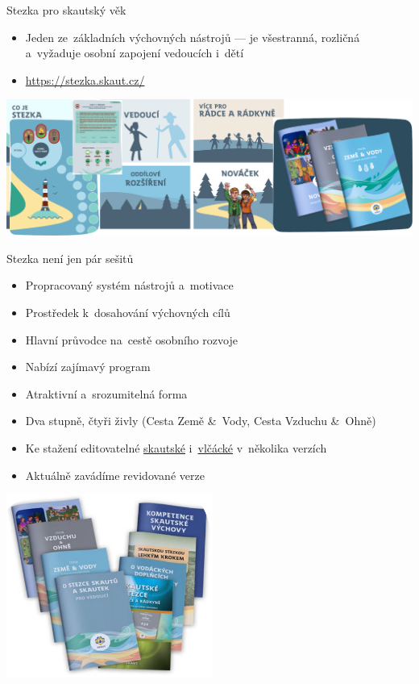 \documentclass[compress, ucs, xelatex, 11pt, xcolor=dvipsnames, print, aspectratio=169,
	hyperref={
		bookmarks=true,
		unicode=true,
		colorlinks=true,
		pdftitle={Skautska vychovna metoda},
		plainpages=false,
		pdfauthor={Vojtech Zeisek},
		pdfsubject={Skautska vychovna metoda a jeji vyvoj za posledni stoleti a desetileti},
		pdfcreator={XeLaTeX},
		pdfkeywords={Junak, Pedagogika, Skaut, Skauting, Vychovna metoda},
		linkcolor=Red, %
		anchorcolor=ForestGreen, %
		citecolor=ForestGreen, %
		filecolor=ForestGreen, %
		menucolor=ForestGreen, %
		urlcolor=Sepia, %
		pdftex},
	url={hyphens, lowtilde} %
	]{beamer}
\begin{document}
\begin{frame}{Stezka pro skautský věk}
	\begin{itemize}
		\item Jeden ze~základních výchovných nástrojů --- je všestranná, rozličná a~vyžaduje osobní zapojení vedoucích i~dětí
		\item \url{https://stezka.skaut.cz/}
	\end{itemize}
	\begin{center}
		\includegraphics[width=\textwidth]{stezka.png}
	\end{center}
\end{frame}

\begin{frame}{Stezka není jen pár sešitů}
	\begin{multicols}{2}
		\begin{itemize}
			\item Propracovaný systém nástrojů a~motivace
			\item Prostředek k~dosahování výchovných cílů
			\item Hlavní průvodce na~cestě osobního rozvoje
			\item Nabízí zajímavý program
			\item Atraktivní a~srozumitelná forma
			\item Dva stupně, čtyři živly (Cesta Země \&~Vody, Cesta Vzduchu \&~Ohně)
			\item Ke stažení editovatelné \href{https://krizovatka.skaut.cz/skautky-skauti/stezky/ke-stazeni}{skautské} i~\href{https://krizovatka.skaut.cz/svetlusky-zabicky-vlcata/stezky-a-cesticky-vlcat-svetlusek-a-zabicek}{vlčácké} v~několika verzích
			\item Aktuálně zavádíme revidované verze
		\end{itemize}
		\columnbreak
		\begin{center}
			\includegraphics[height=6cm]{stezky.png}
		\end{center}
	\end{multicols}
\end{frame}
\end{document}

